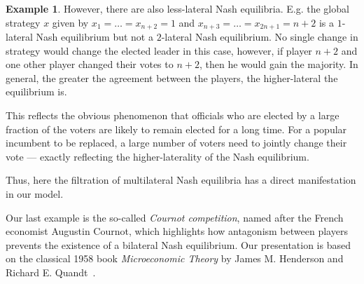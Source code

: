 \documentclass[a4paper,11pt,reqno,english]{amsart}
\theoremstyle{plain}
\theoremstyle{definition}
\newtheorem{example}[theorem]{Example}
\begin{document}
\begin{example}
	\medskip
	However, there are also less-lateral Nash equilibria.
	E.g. the global strategy $x$ given by $x_1=\dots=x_{n+2} = 1$ and $x_{n+3}=\dots=x_{2n+1} = n+2$ is a $1$-lateral Nash equilibrium but not a $2$-lateral Nash equilibrium.
	No single change in strategy would change the elected leader in this case, however, if player $n+2$ and one other player changed their votes to $n+2$, then he would gain the majority.
	In general, the greater the agreement between the players, the higher-lateral the equilibrium is.

	\medskip
	This reflects the obvious phenomenon that officials who are elected by a large fraction of the voters are likely to remain elected for a long time.
	For a popular incumbent to be replaced, a large number of voters need to jointly change their vote --- exactly reflecting the higher-laterality of the Nash equilibrium.

	\medskip
	Thus, here the filtration of multilateral Nash equilibria has a direct manifestation in our model.
\end{example}

\medskip
Our last example is the so-called \textit{Cournot competition}, named after the French economist Augustin Cournot, which highlights how antagonism between players prevents the existence of a bilateral Nash equilibrium. Our presentation is based on the classical 1958 book \textit{Microeconomic Theory} by James M. Henderson and Richard E. Quandt~\cite{HendersonQuandt1958}.
\end{document}
